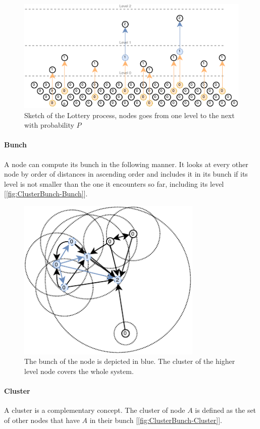 \documentclass[a4paper,11pt,oneside]{report}
\begin{document}
\begin{figure}[!h] 
\centering
\includegraphics[width=400pt]{figures/Lottery-Standard}
\caption{Sketch of the Lottery process, nodes goes from one level to the next
  with probability $P$} \label{fig:ClusterBunch-Bunch}
\end{figure}

\paragraph{Bunch} A node can compute its bunch in the following manner. It
looks at every other node by order of distances in ascending order and
includes it in its bunch if its level is not smaller than the one it encounters
so far, including its level [\autoref{fig:ClusterBunch-Bunch}]. 

\begin{figure}[!h] 
\centering
\includegraphics[width=250pt]{figures/ClusterBunch-Bunch}
\caption{ The bunch of the node is depicted in blue. The cluster of the higher
  level node covers the whole system. } \label{fig:ClusterBunch-Bunch}
\end{figure}

\paragraph{Cluster} A cluster is a complementary concept. The cluster of node
$A$ is defined as the set of other nodes that have $A$ in their bunch
[\autoref{fig:ClusterBunch-Cluster}]. 
\end{document}
